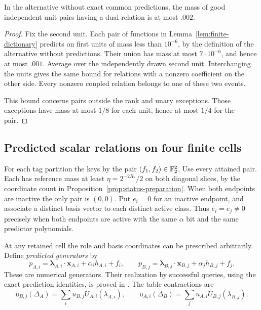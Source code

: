 \begin{lemma}
\label{lem:status-global-prediction}
In the alternative without exact common predictions, the mass of good
independent unit pairs having a dual relation is at most \(.002\).
\end{lemma}
\begin{proof}
Fix the second unit. Each pair of functions in
Lemma~\ref{lem:finite-dictionary} predicts on first units of mass less
than \(10^{-6}\), by the definition of the alternative without predictions. Their union has mass at most \(7\cdot10^{-6}\),
and hence at most \(.001\). Average over the independently drawn second
unit. Interchanging the units gives the same bound for relations with a
nonzero coefficient on the other side. Every nonzero coupled relation
belongs to one of these two events.

This bound concerns pairs outside the rank and unary exceptions.
Those exceptions have mass at most \(1/8\) for each unit, hence at most
\(1/4\) for the pair.

\end{proof}

\subsection{Predicted scalar relations on four finite cells}

For each tag partition the keys by the pair \((f_1,f_2)\in\mathbb F_2^2\).
Use every attained pair. Each has reference mass at least
\(\eta=2^{-2R_*}/2\) on both diagonal slices, by the coordinate count
in Proposition~\ref{prop:status-preparation}. When both endpoints are inactive
the only pair is \((0,0)\).
Put \(e_i=0\) for an inactive endpoint,
and associate a distinct basis vector to each distinct active class.
Thus \(e_i=e_j\ne0\) precisely when both endpoints are active with
the same \(\alpha\) bit and the same predictor polynomials.

At any retained cell the role and basis coordinates can be prescribed
arbitrarily. Define
\emph{predicted generators} by
\[
 p_{A,i}=\boldsymbol\lambda_{A,i}\cdot\mathbf x_{A,i}
             +\alpha_i h_{A,i}+f_i,\qquad
 p_{B,j}=\boldsymbol\lambda_{B,j}\cdot\mathbf x_{B,j}
             +\alpha_j h_{B,j}+f_j.
\]
These are numerical generators. Their realization by successful queries,
using the exact prediction identities, is proved in .
The table contractions are
\begin{equation}\label{eq:status-table-delta}
 \mathsf u_{B,j}(\Delta_A)=\sum_iu_{B,j}U_{A,i}(\lambda_{A,i}),\qquad
 \mathsf u_{A,i}(\Delta_B)=\sum_ju_{A,i}U_{B,j}(\lambda_{B,j}).
\end{equation}

